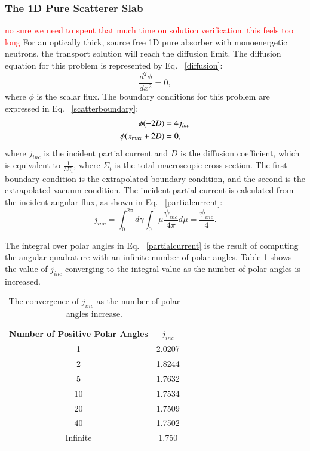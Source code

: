 \documentclass{anstrans}
\newcommand{\tcr}[1]{\textcolor{red}{#1}}
\begin{document}
\subsubsection{The 1D Pure Scatterer Slab}
\tcr{no sure we need to spent that much time on solution verification. this feels too long}
For an optically thick, source free 1D pure absorber with monoenergetic neutrons, the transport solution will reach the diffusion limit. The diffusion equation for this problem is represented by Eq. ~\eqref{diffusion}:
\begin{equation}
\frac{d^2\phi}{dx^2} = 0,
\label{diffusion}
\end{equation}
where $\phi$ is the scalar flux. The boundary conditions for this problem are expressed in Eq. ~\eqref{scatterboundary}:
\begin{align}
\phi(-2D) &= 4j_{inc} \notag \\
\phi(x_{\text{max}}+2D) &= 0, 
\label{scatterboundary}
\end{align}
where $j_{inc}$ is the incident partial current and $D$ is the diffusion coefficient, which is equivalent to $\frac{1}{3 \Sigma_t}$, where $\Sigma_t$ is the total macroscopic cross section. The first boundary condition is the extrapolated boundary condition, and the second is the extrapolated vacuum condition. The incident partial current is calculated from the incident angular flux, as shown in Eq. ~\eqref{partialcurrent}:
\begin{equation}
j_{inc} = \int_{0}^{2\pi}d\gamma \int_{0}^{1} \mu \frac{\psi_{inc}}{4\pi} d\mu = \frac{\psi_{inc}}{4}.
\label{partialcurrent}
\end{equation}

The integral over polar angles in Eq. ~\eqref{partialcurrent} is the result of computing the angular quadrature with an infinite number of polar angles. Table \ref{angleconvergence} shows the value of $j_{inc}$ converging to the integral value as the number of polar angles is increased. 
\begin{table}[H]
\centering
\caption{The convergence of $j_{inc}$ as the number of polar angles increase.}
\begin{tabular}{c c}
\hline
\textbf{Number of Positive Polar Angles} & \textbf{$j_{inc}$} \\
1 & 2.0207 \\
2 & 1.8244 \\
5 & 1.7632 \\
10 & 1.7534 \\
20 & 1.7509 \\
40 & 1.7502 \\
Infinite & 1.750 \\
\hline
\end{tabular}
\label{angleconvergence}
\end{table}
\end{document}
